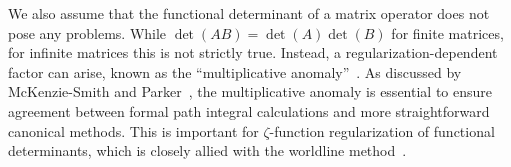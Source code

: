 We also assume that the functional determinant of a matrix operator does not pose any problems.  
While $\det(AB)=\det(A)\det(B)$ for finite matrices, for infinite matrices this is not strictly true. 
Instead, a regularization-dependent factor can arise, known as the ``multiplicative anomaly''~\cite{Elizalde1998}.
As discussed by McKenzie-Smith and Parker~\cite{McKenzieSmith1998}, 
the multiplicative anomaly is essential to ensure agreement between 
formal path integral calculations and more straightforward canonical methods.  
This is important for $\zeta$-function regularization of functional determinants, 
which is closely allied with the worldline method~\cite{Elizalde2008}.

